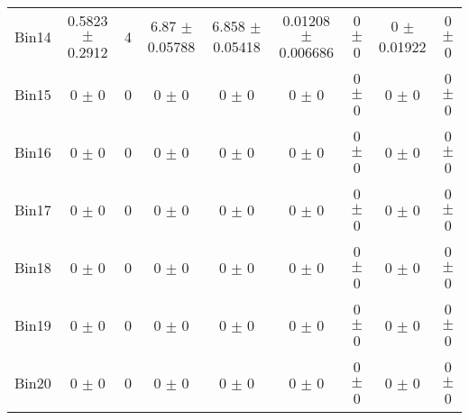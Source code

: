 \begin{tabular}{@{\extracolsep{4pt}}lcccccccc@{}}
     Bin14 & 0.5823 $\pm$ 0.2912 & 4 & 6.87 $\pm$ 0.05788 & 6.858 $\pm$ 0.05418 & 0.01208 $\pm$ 0.006686 & 0 $\pm$ 0 & 0 $\pm$ 0.01922 & 0 $\pm$ 0 \\ 
     Bin15 & 0 $\pm$ 0 & 0 & 0 $\pm$ 0 & 0 $\pm$ 0 & 0 $\pm$ 0 & 0 $\pm$ 0 & 0 $\pm$ 0 & 0 $\pm$ 0 \\ 
     Bin16 & 0 $\pm$ 0 & 0 & 0 $\pm$ 0 & 0 $\pm$ 0 & 0 $\pm$ 0 & 0 $\pm$ 0 & 0 $\pm$ 0 & 0 $\pm$ 0 \\ 
     Bin17 & 0 $\pm$ 0 & 0 & 0 $\pm$ 0 & 0 $\pm$ 0 & 0 $\pm$ 0 & 0 $\pm$ 0 & 0 $\pm$ 0 & 0 $\pm$ 0 \\ 
     Bin18 & 0 $\pm$ 0 & 0 & 0 $\pm$ 0 & 0 $\pm$ 0 & 0 $\pm$ 0 & 0 $\pm$ 0 & 0 $\pm$ 0 & 0 $\pm$ 0 \\ 
     Bin19 & 0 $\pm$ 0 & 0 & 0 $\pm$ 0 & 0 $\pm$ 0 & 0 $\pm$ 0 & 0 $\pm$ 0 & 0 $\pm$ 0 & 0 $\pm$ 0 \\ 
     Bin20 & 0 $\pm$ 0 & 0 & 0 $\pm$ 0 & 0 $\pm$ 0 & 0 $\pm$ 0 & 0 $\pm$ 0 & 0 $\pm$ 0 & 0 $\pm$ 0 \\ 
\hline\hline
  \end{tabular}
